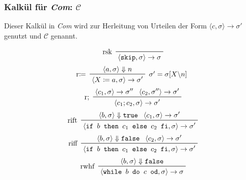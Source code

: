 \documentclass[a4paper, 11pt, accentcolor = tud3b]{tudreport}
\begin{document}
			    \subsubsection{Kalkül für \textit{Com}: $ \mathcal{C} $}
				    Dieser Kalkül in \textit{Com} wird zur Herleitung von Urteilen der Form $ \langle c, \sigma \rangle \rightarrow \sigma' $ genutzt und $ \mathcal{C} $ genannt.
			    
				    \begin{multicols}{2}
				    	\begin{equation*}
					    	\prftree[l]
						    	{ rsk }
						    	{ \langle \texttt{skip}, \sigma \rangle \rightarrow \sigma }
				    	\end{equation*}
				    	\begin{equation*}
					    	\prftree[l, r]
						    	{ $ \sigma' = \sigma[X \backslash n] $ }
						    	{ r$ \coloneqq $ }
						    	{ \langle a, \sigma \rangle \Downarrow n }
						    	{ \langle X \coloneqq a, \sigma \rangle \rightarrow \sigma' }
				    	\end{equation*}
				    	\begin{equation*}
					    	\prftree[l]
						    	{ r; }
						    	{ \langle c _ 1, \sigma \rangle \rightarrow \sigma'' }
						    	{ \langle c _ 2, \sigma'' \rangle \rightarrow \sigma' }
						    	{ \langle c _ 1 ; c _ 2, \sigma \rangle \rightarrow \sigma' }
				    	\end{equation*}
				    	\begin{equation*}
						    \prftree[l]
							    { rift }
							    { \langle b, \sigma \rangle \Downarrow \texttt{true} }
							    { \langle c _ 1, \sigma \rangle \rightarrow \sigma' }
							    { \langle \texttt{if } b \texttt{ then } c _ 1 \texttt{ else } c _ 2 \texttt{ fi}, \sigma \rangle \rightarrow \sigma' }
				    	\end{equation*}
				    	\begin{equation*}
					    	\prftree[l]
						    	{ riff }
						    	{ \langle b, \sigma \rangle \Downarrow \texttt{false} }
						    	{ \langle c _ 2, \sigma \rangle \rightarrow \sigma' }
						    	{ \langle \texttt{if } b \texttt{ then } c _ 1 \texttt{ else } c _ 2 \texttt{ fi}, \sigma \rangle \rightarrow \sigma' }
				    	\end{equation*}
				    	\begin{equation*}
					    	\prftree[l]
						    	{ rwhf }
						    	{ \langle b, \sigma \rangle \Downarrow \texttt{false} }
						    	{ \langle \texttt{while } b \texttt{ do } c \texttt{ od}, \sigma \rangle \rightarrow \sigma }
				    	\end{equation*}
				    \end{multicols}
\end{document}
